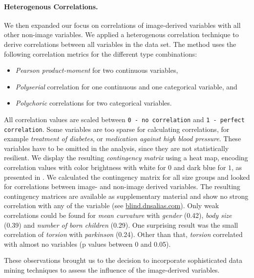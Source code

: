 \documentclass[a4paper,twoside]{style/article}
\begin{document}
\paragraph{Heterogenous Correlations.}
We then expanded our focus on correlations of image-derived variables with all other non-image variables.
We applied a heterogenous correlation technique to derive correlations between all variables in the data set.
The method uses the following correlation metrics for the different type combinations:
\begin{itemize}
\item \emph{Pearson product-moment} for two continuous variables, 
\item \emph{Polyserial} correlation for one continuous and one categorical variable, and
\item \emph{Polychoric} correlations for two categorical variables.
\end{itemize}
All correlation values are scaled between \texttt{0 - no correlation} and \texttt{1 - perfect correlation}.
Some variables are too sparse for calculating correlations, for example \emph{treatment of diabetes}, or \emph{medication against high blood pressure}.
These variables have to be omitted in the analysis, since they are not statistically resilient.
We display the resulting \emph{contingency matrix} using a heat map, encoding correlation values with color brightness with white for $0$ and dark blue for $1$, as presented in \cite{Klemm2014VIS}.
We calculated the contingency matrix for all size groups and looked for correlations between image- and non-image derived variables.
The resulting contingency matrices are available as supplementary material and show no strong correlation with any of the variable (see \url{blind.dnsalias.com}).
Only weak correlations could be found for \emph{mean curvature} with \emph{gender} (0.42), \emph{body size} (0.39) and \emph{number of born children} (0.29).
One surprising result was the small correlation of \emph{torsion} with \emph{parkinson} (0.24).
Other than that, \emph{torsion} correlated with almost no variables (p values between 0 and 0.05).

These observations brought us to the decision to incorporate sophisticated data mining techniques to assess the influence of the image-derived variables.
\end{document}

